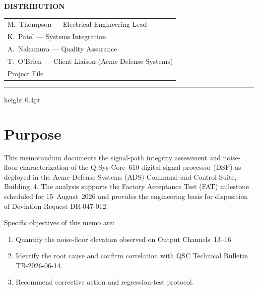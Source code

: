 \documentclass[11pt,letterpaper]{article}
\begin{document}
{\sffamily\small\color{accent}\bfseries DISTRIBUTION}

\vspace{3pt}

\begin{tabularx}{\linewidth}{@{}>{\color{graytext}\faEnvelope[regular]\hspace{6pt}}X@{}}
  M.\ Thompson --- Electrical Engineering Lead \\[1pt]
  K.\ Patel --- Systems Integration \\[1pt]
  A.\ Nakamura --- Quality Assurance \\[1pt]
  T.\ O'Brien --- Client Liaison (Acme Defense Systems) \\[1pt]
  Project File \\
\end{tabularx}

\vspace{6pt}
{\color{lightrule}\hrule height 0.4pt}
\vspace{10pt}

\section{Purpose}

This memorandum documents the signal-path integrity assessment and noise-floor
characterization of the Q-Sys Core~610 digital signal processor (DSP) as deployed
in the Acme Defense Systems (ADS) Command-and-Control Suite, Building~4. The
analysis supports the Factory Acceptance Test (FAT) milestone scheduled for
15~August~2026 and provides the engineering basis for disposition of Deviation
Request DR-047-012.

Specific objectives of this memo are:
\begin{enumerate}[leftmargin=*, label=\textcolor{accent}{\textbf{(\arabic*)}}, nosep, before=\vspace{2pt}, after=\vspace{0pt}]
  \item Quantify the noise-floor elevation observed on Output Channels~13--16.
  \item Identify the root cause and confirm correlation with QSC Technical
        Bulletin TB-2026-06-14.
  \item Recommend corrective action and regression-test protocol.
\end{enumerate}
\end{document}
